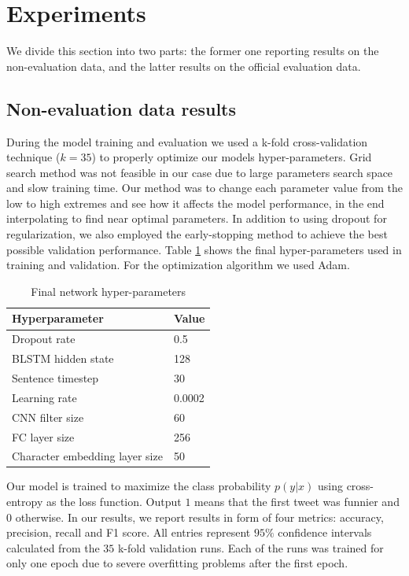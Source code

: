 \documentclass[10pt, a4paper]{article}
\begin{document}
\section{Experiments}
We divide this section into two parts: the former one reporting results on the
non-evaluation data, and the latter results on the official evaluation data.

\subsection{Non-evaluation data results}
During the model training and evaluation we used a k-fold cross-validation technique
($k=35$) to properly optimize our models hyper-parameters. Grid search
method was not feasible in our case due to large parameters
search space and slow training time. Our method was to change each parameter
value from the low to high extremes and see how it affects the model
performance, in the end interpolating to find near optimal parameters.
In addition to using dropout for regularization, we also employed the
early-stopping\cite{early_stopping} method to achieve the best possible validation
performance. Table \ref{tab:hyperparams} shows the final hyper-parameters used
in training and validation. For the optimization algorithm we used
Adam\cite{Adam}.

\begin{table}
\small
\caption{Final network hyper-parameters}
 \label{tab:hyperparams}
 \begin{center}
 \begin{tabular}{ll}
 \toprule
     Hyperparameter & Value\\
 \midrule
     Dropout rate & 0.5\\
     BLSTM hidden state & 128\\
     Sentence timestep & 30\\
     Learning rate & 0.0002\\
     CNN filter size & 60 \\
     FC layer size & 256\\
     Character embedding layer size & 50\\
 \bottomrule
 \end{tabular}
 \end{center}
\end{table}

Our model is trained to maximize the class probability $p(y \vert x)$ using
cross-entropy as the loss function. Output $1$ means that the first tweet was
funnier and $0$ otherwise. 
In our results, we report results in form of
four metrics: accuracy, precision, recall and F1 score. All entries represent
$95\%$ confidence intervals calculated from the $35$ k-fold validation runs.
Each of the runs was trained for only one epoch due to severe overfitting
problems after the first epoch.
\end{document}
